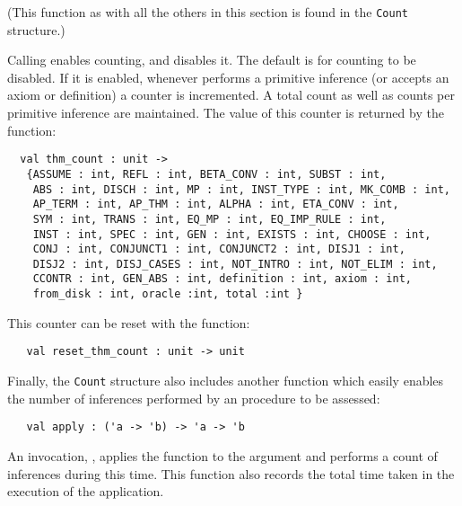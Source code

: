 \noindent (This function as with all the others in this section is
found in the \texttt{Count} structure.)

Calling  enables counting, and
 disables it.  The default is for counting to
be disabled.  If it is enabled, whenever \HOL{} performs a primitive
inference (or accepts an axiom or definition) a counter is
incremented.  A total count as well as counts per primitive inference
are maintained.  The value of this counter is returned by the
function:

\begin{holboxed}
\begin{verbatim}
  val thm_count : unit ->
   {ASSUME : int, REFL : int, BETA_CONV : int, SUBST : int,
    ABS : int, DISCH : int, MP : int, INST_TYPE : int, MK_COMB : int,
    AP_TERM : int, AP_THM : int, ALPHA : int, ETA_CONV : int,
    SYM : int, TRANS : int, EQ_MP : int, EQ_IMP_RULE : int,
    INST : int, SPEC : int, GEN : int, EXISTS : int, CHOOSE : int,
    CONJ : int, CONJUNCT1 : int, CONJUNCT2 : int, DISJ1 : int,
    DISJ2 : int, DISJ_CASES : int, NOT_INTRO : int, NOT_ELIM : int,
    CCONTR : int, GEN_ABS : int, definition : int, axiom : int,
    from_disk : int, oracle :int, total :int }
\end{verbatim}\end{holboxed}

\noindent This counter can be reset with the function:

\begin{holboxed}
\begin{verbatim}
   val reset_thm_count : unit -> unit
\end{verbatim}\end{holboxed}

Finally, the \texttt{Count} structure also includes another function
which easily enables the number of inferences performed by an \ML{}
procedure to be assessed:

\begin{holboxed}
\begin{verbatim}
   val apply : ('a -> 'b) -> 'a -> 'b
\end{verbatim}
\end{holboxed}

An invocation, , applies the function  to
the argument  and performs a count of inferences during this
time.  This function also records the total time taken in the
execution of the application.

